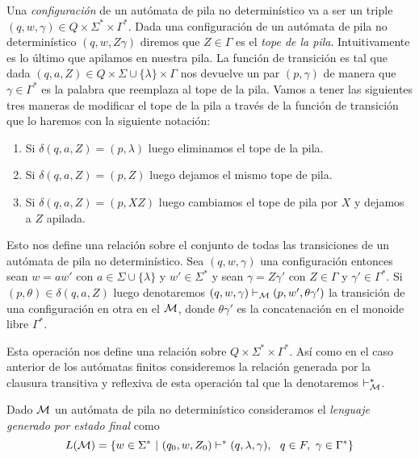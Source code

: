 \documentclass[tesis.tex]{subfiles}
\begin{document}
Una \emph{configuración} de un autómata de pila no determinístico va a ser un triple $(q,w,\gamma) \in Q \times \Sigma^* \times \Gamma^*$.
Dada una configuración de un autómata de pila no determinístico $(q,w, Z\gamma)$ diremos que $Z \in \Gamma$ es el \emph{tope de la pila}.
Intuitivamente es lo último que apilamos en nuestra pila.
La función de transición es tal que dada $(q,a,Z) \in Q  \times \Sigma \cup \{ \lambda \} \times \Gamma $ nos devuelve un par $(p,\gamma)$ de manera que $\gamma \in \Gamma^{*}$ es la palabra que reemplaza al tope de la pila.
Vamos a tener las siguientes tres maneras de modificar el tope de la pila a través de la función de transición que lo haremos con la siguiente notación:

\begin{enumerate}
	\item Si $\delta(q,a,Z) = (p,\lambda)$ luego eliminamos el tope de la pila.
	\item Si $\delta(q,a,Z) =  (p,Z)$ luego dejamos el mismo tope de pila.
	\item Si $\delta(q,a,Z) = (p, XZ)$ luego cambiamos el tope de pila por $X$ y dejamos a $Z$ apilada.
\end{enumerate}


Esto nos define una relación sobre el conjunto de todas las transiciones de un autómata de pila no determinístico.
Sea $(q,w,\gamma)$ una configuración entonces sean $w = aw'$ con $a \in \Sigma \cup \{ \lambda \}$ y $w' \in \Sigma^*$  y sean $\gamma = Z\gamma'$ con $Z \in \Gamma$ y $\gamma' \in \Gamma^{*}$.
Si $(p,\theta) \in \delta (q,a,Z)$  luego denotaremos $(q,w,\gamma) \vdash_{\cal M} (p,w',\theta\gamma')$ la transición de una configuración en otra en el \APND $\cal M$,
donde $\theta \gamma'$ es la concatenación en el monoide libre $\Gamma^{*}$. 

Esta operación nos define una relación sobre $Q \times \Sigma^* \times \Gamma^*$.
Así como en el caso anterior de los autómatas finitos consideremos la relación generada por la clausura transitiva y reflexiva de esta operación tal que la denotaremos $\vdash^*_{\cal M}$.


\begin{deff}
	Dado $\cal M$ un autómata de pila no determinístico consideramos el \emph{lenguaje generado por estado final} como
	\begin{equation*}
		L( {\cal M}) = \{ w \in \Sigma^* \ | \ (q_0,w,Z_0) \vdash^* (q, \lambda, \gamma), \ \ q \in F, \ \gamma \in \Gamma^*      \}
	\end{equation*}
\end{deff}
\end{document}
